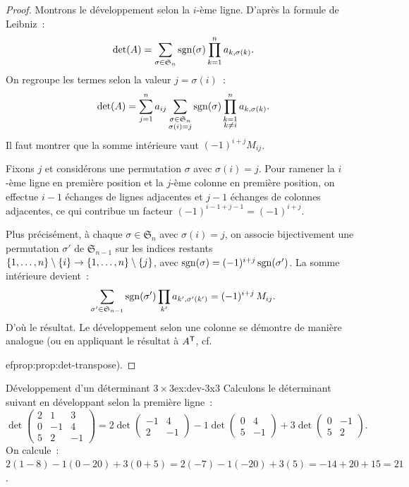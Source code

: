 \begin{proof}
  Montrons le développement selon la $i$-ème ligne. D'après la formule
  de Leibniz~:
  \[
    \det(A)=\sum_{\sigma\in\mathfrak{S}_n}\operatorname{sgn}(\sigma)
    \prod_{k=1}^{n}a_{k,\sigma(k)}.
  \]
  On regroupe les termes selon la valeur $j=\sigma(i)$~:
  \[
    \det(A)=\sum_{j=1}^{n}a_{ij}\sum_{\substack{\sigma\in\mathfrak{S}_n\\
    \sigma(i)=j}}\operatorname{sgn}(\sigma)\prod_{\substack{k=1\\k\neq i}}^{n}
    a_{k,\sigma(k)}.
  \]
  Il faut montrer que la somme intérieure vaut $(-1)^{i+j}M_{ij}$.

  Fixons $j$ et considérons une permutation $\sigma$ avec $\sigma(i)=j$.
  Pour ramener la $i$-ème ligne en première position et la $j$-ème
  colonne en première position, on effectue $i-1$ échanges de lignes
  adjacentes et $j-1$ échanges de colonnes adjacentes, ce qui contribue
  un facteur $(-1)^{i-1+j-1}=(-1)^{i+j}$.

  Plus précisément, à chaque $\sigma\in\mathfrak{S}_n$ avec $\sigma(i)=j$,
  on associe bijectivement une permutation $\sigma'$ de $\mathfrak{S}_{n-1}$
  sur les indices restants $\left\{1,\ldots,n\right\}\setminus\left\{i\right\}
  \to\left\{1,\ldots,n\right\}\setminus\left\{j\right\}$, avec
  $\operatorname{sgn}(\sigma)=(-1)^{i+j}\operatorname{sgn}(\sigma')$. La somme intérieure devient~:
  \[
    \sum_{\sigma'\in\mathfrak{S}_{n-1}}\operatorname{sgn}(\sigma')\prod_{k'}
    a_{k',\sigma'(k')}=(-1)^{i+j}\,M_{ij}.
  \]
  D'où le résultat. Le développement selon une colonne se démontre de
  manière analogue (ou en appliquant le résultat à ${A}^{\mathsf{T}}$, cf.\
  
ef{prop:prop:det-transpose}).
\end{proof}

\begin{example}{Développement d'un déterminant $3\times 3$}{ex:dev-3x3}
  Calculons le déterminant suivant en développant selon la première ligne~:
  \[
    \det\begin{pmatrix}2&1&3\\0&-1&4\\5&2&-1\end{pmatrix}
    =2\det\begin{pmatrix}-1&4\\2&-1\end{pmatrix}
    -1\det\begin{pmatrix}0&4\\5&-1\end{pmatrix}
    +3\det\begin{pmatrix}0&-1\\5&2\end{pmatrix}.
  \]
  On calcule~:
  $2(1-8)-1(0-20)+3(0+5)=2(-7)-1(-20)+3(5)=-14+20+15=21$.
\end{example}

